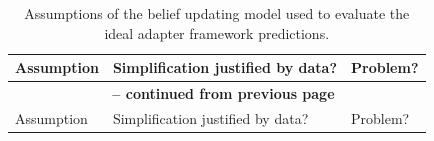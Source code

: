\nocite{Vitevitch2004,Zhu2007}

\clearpage

\begin{footnotesize}
  \linespread{1.1}

\begin{center}
\begin{longtable}{p{} | p{} | p{}}
  \caption{Assumptions of the belief updating model used to evaluate the ideal adapter framework predictions.} \label{tab:model-assumptions} \\

  Assumption & Simplification justified by data? & Problem? \\ \hline
  \endfirsthead

  \multicolumn{3}{c}{{\bfseries \tablename\ \thetable{} -- continued from previous page}} \\
  Assumption & Simplification justified by data? & Problem? \\ \hline
  \endhead


\end{longtable}
\end{center}
\end{footnotesize}
